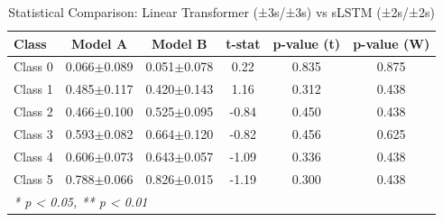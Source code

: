 \begin{table}[htbp]
\centering
\caption{Statistical Comparison: Linear Transformer (±3s/±3s) vs sLSTM (±2s/±2s)}
\label{tab:comparison_class_linear_transformer_±3s_±3s_vs_slstm_±2s_±2s}
\begin{tabular}{lccccc}
\toprule
\textbf{Class} & \textbf{Model A} & \textbf{Model B} & \textbf{t-stat} & \textbf{p-value (t)} & \textbf{p-value (W)} \\
\midrule
Class 0 & 0.066$\pm$0.089 & 0.051$\pm$0.078 & 0.22 & 0.835 & 0.875 \\
Class 1 & 0.485$\pm$0.117 & 0.420$\pm$0.143 & 1.16 & 0.312 & 0.438 \\
Class 2 & 0.466$\pm$0.100 & 0.525$\pm$0.095 & -0.84 & 0.450 & 0.438 \\
Class 3 & 0.593$\pm$0.082 & 0.664$\pm$0.120 & -0.82 & 0.456 & 0.625 \\
Class 4 & 0.606$\pm$0.073 & 0.643$\pm$0.057 & -1.09 & 0.336 & 0.438 \\
Class 5 & 0.788$\pm$0.066 & 0.826$\pm$0.015 & -1.19 & 0.300 & 0.438 \\
\bottomrule
\multicolumn{6}{l}{\textit{* p < 0.05, ** p < 0.01}} \\
\end{tabular}
\end{table}